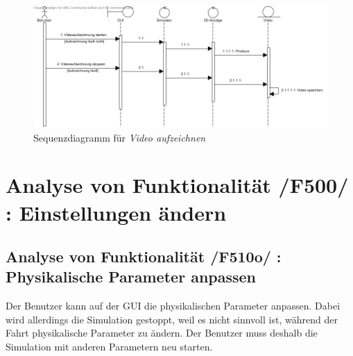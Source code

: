\begin{figure}[!h]
\includegraphics[width=\linewidth]{bilder/Video_aufzeichnen}
\caption{Sequenzdiagramm für \textit{Video aufzeichnen}}
\end{figure}

\newpage
\section{Analyse von Funktionalität /F500/ :  Einstellungen ändern}
\subsection{Analyse von Funktionalität /F510o/ :  Physikalische Parameter anpassen}
Der Benutzer kann auf der GUI die physikalischen Parameter anpassen. Dabei wird allerdings die Simulation gestoppt, weil es nicht sinnvoll ist, während der Fahrt physikalische Parameter zu ändern. Der Benutzer muss deshalb die Simulation mit anderen Parametern neu starten.


